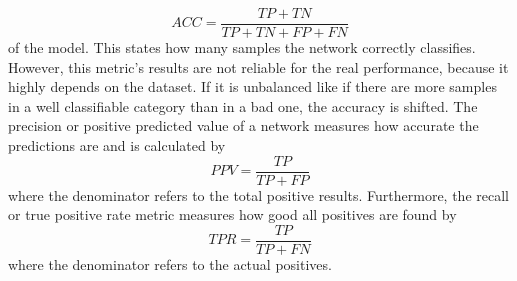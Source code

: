 \begin{equation}
	ACC = \frac{TP + TN}{TP + TN + FP + FN}
\end{equation}
of the model.
This states how many samples the network correctly classifies.
However, this metric's results are not reliable for the real performance, because it highly depends on the dataset.
If it is unbalanced like if there are more samples in a well classifiable category than in a bad one, the accuracy is shifted.
The precision or positive predicted value of a network measures how accurate the predictions are and is calculated by
\begin{equation}
	\label{eq:metric-precision}
	PPV = \frac{TP}{TP + FP}
\end{equation}
where the denominator refers to the total positive results.
Furthermore, the recall or true positive rate metric measures how good all positives are found by
\begin{equation}
	\label{eq:metric-recall}
	TPR = \frac{TP}{TP + FN}
\end{equation}
where the denominator refers to the actual positives.